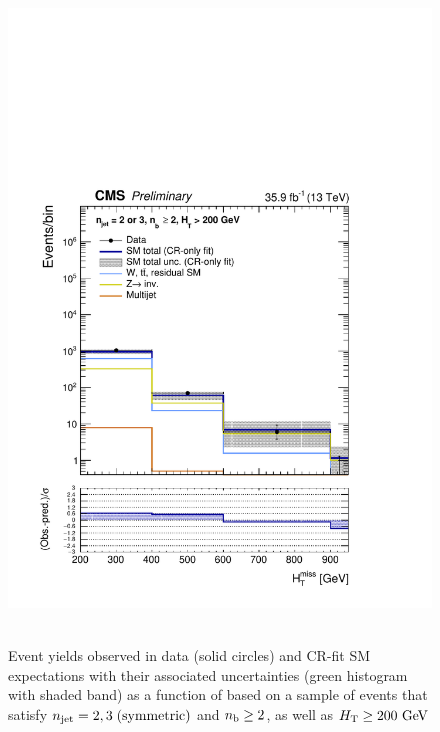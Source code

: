 \clearpage
\begin{figure}[h!]
  \centering
  \caption{Event yields observed in data (solid circles) and CR-fit SM expectations with their associated uncertainties 
  (green histogram with shaded band) as a function of \HTmiss based on a sample of events that satisfy 
  $n_{\text{jet}} = 2, 3 \; \textrm{(symmetric)}$ and $n_{\text{b}} \geq  2$, as well as $\mbox{$H_\text{T}$} \geq 200 \textrm{ GeV}$ }
  \includegraphics[width=0.8\linewidth]{figures/results/36invfb_preapproval/aggregated/postFitShapeCR/mhtShape_ge2b_eq23j_200_Inf_crfit.pdf} ~
\end{figure}

